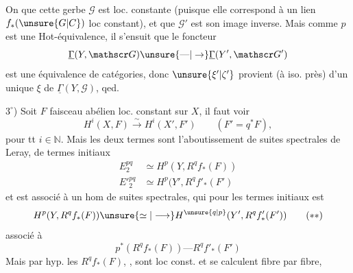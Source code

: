 
On  que cette gerbe $\mathscr G$ est loc. constante
(puisque elle correspond à un lien $f_*(\unsure{G|C})$ loc constant),
et que $\mathscr G'$ est son image inverse. Mais comme
$p$ est une Hot-équivalence, il s'ensuit que
le foncteur
\[
\underline{\Gamma}(Y,\mathscr G)\unsure{\text{---}|\to}\underline{\Gamma}(Y',\mathscr G')
\]
est une équivalence de catégories, donc $\unsure{\xi'|\zeta'}$
provient (à iso. près) d'un unique $\xi$ de $\underline{\Gamma}(Y,\mathscr G)$,
qed.

$3^\circ$) Soit $F$ faisceau abélien loc. constant sur $X$,
il faut voir
\[
H^i(X,F)\xrightarrow{\sim} H^i(X',F')\qquad (F'=q^*F),\tag*{$(*)$}
\]
pour tt $i\in\mathbb N$. Mais  les deux termes sont
l'aboutissement de suites spectrales de
Leray, de termes initiaux
\[
\begin{aligned}
E_2^{pq}&\simeq H^p(Y,R^q f_*(F))\\
E'{}^{pq}_2&\simeq H^p(Y',R^q f'_*(F')
\end{aligned}
\]
et  est associé à un hom de suites
spectrales, qui pour les termes initiaux est
\[
H^p(Y,R^q f_*(F))\unsure{\simeq|\longrightarrow}H^{\unsure{q|p}}(Y',R^q f'_*(F'))\tag*{$(**)$}
\]
associé à
\[
p^*(R^q f_*(F))\text{---}R^q f'_*(F')\tag*{$(***)$}
\]
Mais par hyp. les $R^q f_*(F)$, , sont loc const.
et se calculent fibre par fibre,


